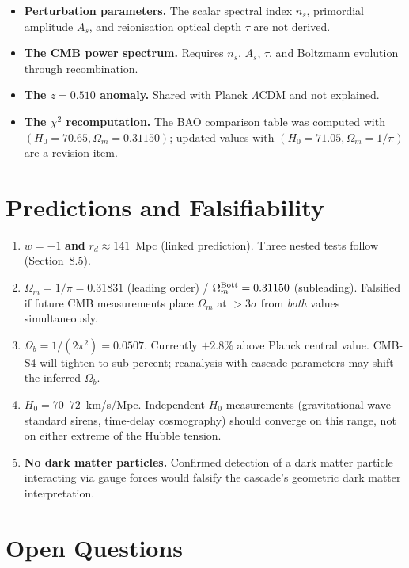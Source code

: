 \documentclass[12pt,a4paper]{article}
\begin{document}
\begin{itemize}
\item \textbf{Perturbation parameters.} The scalar spectral index $n_s$, primordial amplitude
$A_s$, and reionisation optical depth $\tau$ are not derived.
\item \textbf{The CMB power spectrum.} Requires $n_s$, $A_s$, $\tau$, and Boltzmann evolution
through recombination.
\item \textbf{The $z = 0.510$ anomaly.} Shared with Planck $\Lambda$CDM and not explained.
\item \textbf{The $\chi^2$ recomputation.} The BAO comparison table was computed with
$(H_0 = 70.65, \Omega_m = 0.31150)$; updated values with $(H_0 = 71.05, \Omega_m = 1/\pi)$
are a revision item.
\end{itemize}

\section{Predictions and Falsifiability}

\begin{enumerate}
\item $w = -1$ \textbf{and} $r_d \approx 141$~Mpc (linked prediction). Three nested tests
follow (Section~8.5).
\item $\Omega_m = 1/\pi = 0.31831$ (leading order) / $\Omega_m^{\rm Bott} = 0.31150$ (subleading).
Falsified if future CMB measurements place $\Omega_m$ at $> 3\sigma$ from \emph{both}
values simultaneously.
\item $\Omega_b = 1/(2\pi^2) = 0.0507$. Currently $+2.8\%$ above Planck central value.
CMB-S4 will tighten to sub-percent; reanalysis with cascade parameters may shift the
inferred $\Omega_b$.
\item $H_0 = 70$--$72$~km/s/Mpc. Independent $H_0$ measurements (gravitational wave
standard sirens, time-delay cosmography) should converge on this range, not on either
extreme of the Hubble tension.
\item \textbf{No dark matter particles.} Confirmed detection of a dark matter particle
interacting via gauge forces would falsify the cascade's geometric dark matter
interpretation.
\end{enumerate}

\section{Open Questions}
\end{document}
